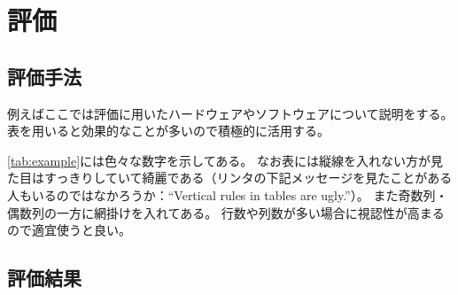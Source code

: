 \chapter{評価}\label{ch:evaluation}

\section{評価手法}\label{sec:methodology}

例えばここでは評価に用いたハードウェアやソフトウェアについて説明をする。
表を用いると効果的なことが多いので積極的に活用する。

\begin{table}[ht]
  \centering
  \caption{数字が色々書いてある表}{
}
\end{table}

\cref{tab:example}には色々な数字を示してある。
なお表には縦線を入れない方が見た目はすっきりしていて綺麗である（リンタの下記メッセージを見たことがある人もいるのではなかろうか：``Vertical rules in tables are ugly.''）。
また奇数列・偶数列の一方に網掛けを入れてある。
行数や列数が多い場合に視認性が高まるので適宜使うと良い。

\section{評価結果}\label{sec:results}

